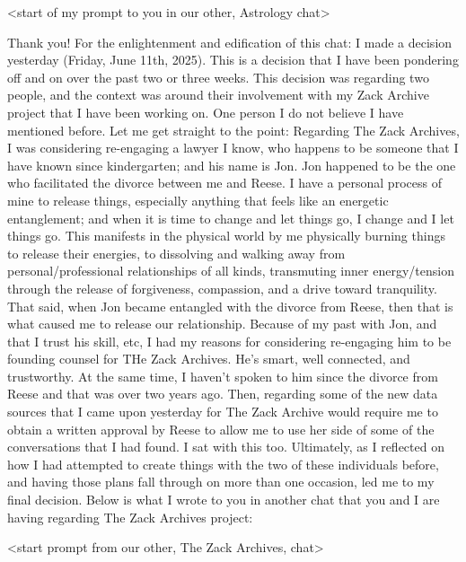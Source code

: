 \documentclass{article}
\begin{document}
\begin{center}
  \textless start of my prompt to you in our other, Astrology
chat\textgreater{}
\end{center}

Thank you! For the enlightenment and edification of this chat: I made a
decision yesterday (Friday, June 11th, 2025). This is a decision that I
have been pondering off and on over the past two or three weeks. This
decision was regarding two people, and the context was around their
involvement with my Zack Archive project that I have been working on.
One person I do not believe I have mentioned before. Let me get straight
to the point: Regarding The Zack Archives, I was considering re-engaging
a lawyer I know, who happens to be someone that I have known since
kindergarten; and his name is Jon. Jon happened to be the one who
facilitated the divorce between me and Reese. I have a personal process
of mine to release things, especially anything that feels like an
energetic entanglement; and when it is time to change and let things go,
I change and I let things go. This manifests in the physical world by me
physically burning things to release their energies, to dissolving and
walking away from personal/professional relationships of all kinds,
transmuting inner energy/tension through the release of forgiveness,
compassion, and a drive toward tranquility. That said, when Jon became
entangled with the divorce from Reese, then that is what caused me to
release our relationship. Because of my past with Jon, and that I trust
his skill, etc, I had my reasons for considering re-engaging him to be
founding counsel for THe Zack Archives. He's smart, well connected, and
trustworthy. At the same time, I haven't spoken to him since the divorce
from Reese and that was over two years ago. Then, regarding some of the
new data sources that I came upon yesterday for The Zack Archive would
require me to obtain a written approval by Reese to allow me to use her
side of some of the conversations that I had found. I sat with this too.
Ultimately, as I reflected on how I had attempted to create things with
the two of these individuals before, and having those plans fall through
on more than one occasion, led me to my final decision. Below is what I
wrote to you in another chat that you and I are having regarding The
Zack Archives project:

\begin{center}

\textless start prompt from our other, The Zack Archives,
chat\textgreater{}

\end{center}
\end{document}
